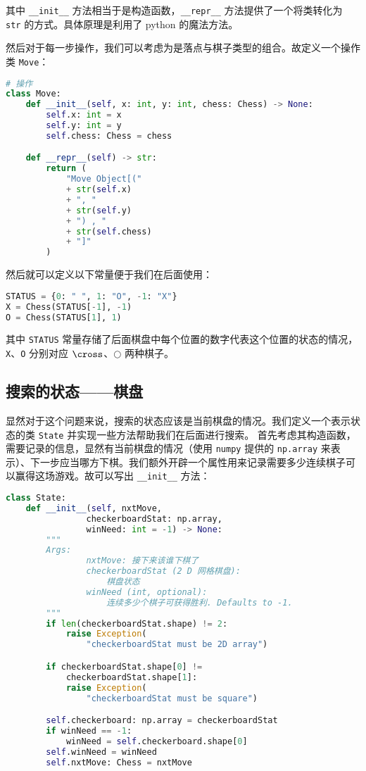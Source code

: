 其中 \verb`__init__` 方法相当于是构造函数，\verb`__repr__` 方法提供了一个将类转化为 \verb`str` 的方式。具体原理是利用了 python 的魔法方法。

然后对于每一步操作，我们可以考虑为是落点与棋子类型的组合。故定义一个操作类 \verb`Move`：
\begin{lstlisting}[language=python]
# 操作
class Move:
    def __init__(self, x: int, y: int, chess: Chess) -> None:
        self.x: int = x
        self.y: int = y
        self.chess: Chess = chess

    def __repr__(self) -> str:
        return (
            "Move Object[("
            + str(self.x)
            + ", "
            + str(self.y)
            + ") , "
            + str(self.chess)
            + "]"
        )
\end{lstlisting}
然后就可以定义以下常量便于我们在后面使用：
\begin{lstlisting}[language=python]
STATUS = {0: " ", 1: "O", -1: "X"}
X = Chess(STATUS[-1], -1)
O = Chess(STATUS[1], 1)
\end{lstlisting}
其中 \verb`STATUS` 常量存储了后面棋盘中每个位置的数字代表这个位置的状态的情况，\verb`X`、\verb`O` 分别对应 $\cross$、$\bigcirc$ 两种棋子。

\subsection{搜索的状态——棋盘}
显然对于这个问题来说，搜索的状态应该是当前棋盘的情况。我们定义一个表示状态的类 \verb`State` 并实现一些方法帮助我们在后面进行搜索。
首先考虑其构造函数，需要记录的信息，显然有当前棋盘的情况（使用 \verb`numpy` 提供的 \verb`np.array` 来表示）、下一步应当哪方下棋。我们额外开辟一个属性用来记录需要多少连续棋子可以赢得这场游戏。故可以写出 \verb`__init__` 方法：
\begin{lstlisting}[language=python]
class State:
    def __init__(self, nxtMove,
                checkerboardStat: np.array,
                winNeed: int = -1) -> None:
        """
        Args:
                nxtMove: 接下来该谁下棋了
                checkerboardStat (2 D 网格棋盘):
                    棋盘状态
                winNeed (int, optional):
                    连续多少个棋子可获得胜利. Defaults to -1.
        """
        if len(checkerboardStat.shape) != 2:
            raise Exception(
                "checkerboardStat must be 2D array")

        if checkerboardStat.shape[0] != 
            checkerboardStat.shape[1]:
            raise Exception(
                "checkerboardStat must be square")

        self.checkerboard: np.array = checkerboardStat
        if winNeed == -1:
            winNeed = self.checkerboard.shape[0]
        self.winNeed = winNeed
        self.nxtMove: Chess = nxtMove
\end{lstlisting}
